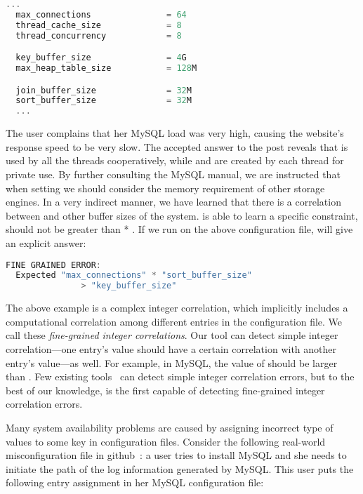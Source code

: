 \begin{lstlisting}[language=C, xleftmargin=.01\textwidth]
  ...
  max_connections               = 64
  thread_cache_size             = 8
  thread_concurrency            = 8

  key_buffer_size               = 4G
  max_heap_table_size           = 128M

  join_buffer_size              = 32M
  sort_buffer_size              = 32M    
  ...
\end{lstlisting} 

The user complains that her MySQL load was very high, 
causing the website's response speed to be very slow.
The accepted answer to the post reveals that  
is used by all the threads cooperatively, 
while  and  are created 
by each thread for private use.
By further consulting the MySQL manual, 
we are instructed that when setting  we should consider the memory requirement of other storage engines.
In a very indirect manner, we have learned that there is a correlation
between  and other buffer sizes of the system.
\app is able to learn a specific constraint, \ie
{} should not be greater than
 * .
If we run \app on the above configuration file, \app will give an explicit answer:

\begin{lstlisting}[language=C, xleftmargin=.01\textwidth]
  FINE GRAINED ERROR:
  Expected "max_connections" * "sort_buffer_size"
               > "key_buffer_size"
\end{lstlisting} 

The above example is a complex integer correlation, which implicitly
includes a computational correlation among different entries
in the configuration file.
We call these {\em fine-grained integer correlations}. 
Our tool can detect simple integer correlation---one entry's
value should have a certain correlation with another entry's 
value---as well.
For example, in MySQL, the value of  
should be larger than .
Few existing tools~\cite{yin11anempirical, zhang14encore}
can detect simple integer correlation errors,
but to the best of our knowledge, \app is the first capable of
detecting fine-grained integer correlation errors.

Many system availability problems are caused by 
assigning incorrect type of values to some key in configuration
files. Consider the following real-world misconfiguration
file in github~\cite{typeerror}:
a user tries to install MySQL and she needs to initiate the path
of the log information generated by MySQL.
This user puts the following entry assignment in her MySQL
configuration file: 

